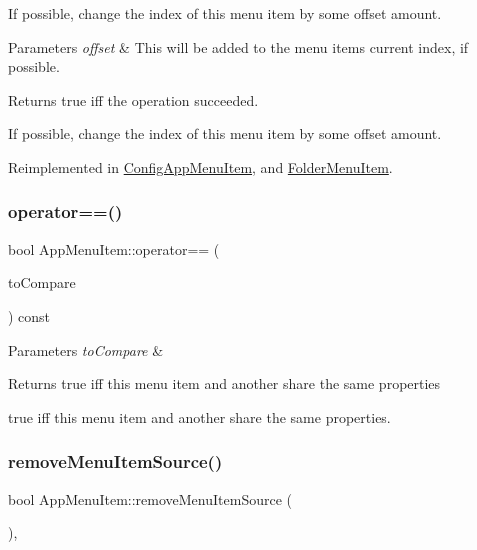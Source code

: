 If possible, change the index of this menu item by some offset amount.


\begin{DoxyParams}{Parameters}
{\em offset} & This will be added to the menu item\textquotesingle{}s current index, if possible.\\
\hline
\end{DoxyParams}
\begin{DoxyReturn}{Returns}
true iff the operation succeeded.
\end{DoxyReturn}
If possible, change the index of this menu item by some offset amount. 

Reimplemented in \mbox{\hyperlink{classConfigAppMenuItem_a3429460996f3d912566ab0a6c901bc11}{Config\+App\+Menu\+Item}}, and \mbox{\hyperlink{classFolderMenuItem_a294208ac148dd8af604edea603d9dcf1}{Folder\+Menu\+Item}}.

\mbox{\label{classAppMenuItem_a06c07fe9236590e173fdb6d51c3a3ff7}} 
\subsubsection{\texorpdfstring{operator==()}{operator==()}}
{\footnotesize\ttfamily bool App\+Menu\+Item\+::operator== (\begin{DoxyParamCaption}\item[{const \mbox{\hyperlink{classAppMenuItem}{App\+Menu\+Item}} \&}]{to\+Compare }\end{DoxyParamCaption}) const}


\begin{DoxyParams}{Parameters}
{\em to\+Compare} & \\
\hline
\end{DoxyParams}
\begin{DoxyReturn}{Returns}
true iff this menu item and another share the same properties

true iff this menu item and another share the same properties. 
\end{DoxyReturn}
\mbox{\label{classAppMenuItem_a5a156a436279e0319c7960ac2931b14d}} 
\subsubsection{\texorpdfstring{remove\+Menu\+Item\+Source()}{removeMenuItemSource()}}
{\footnotesize\ttfamily bool App\+Menu\+Item\+::remove\+Menu\+Item\+Source (\begin{DoxyParamCaption}{ }\end{DoxyParamCaption})\hspace{0.3cm}{\ttfamily [protected]}, {\ttfamily [virtual]}}

